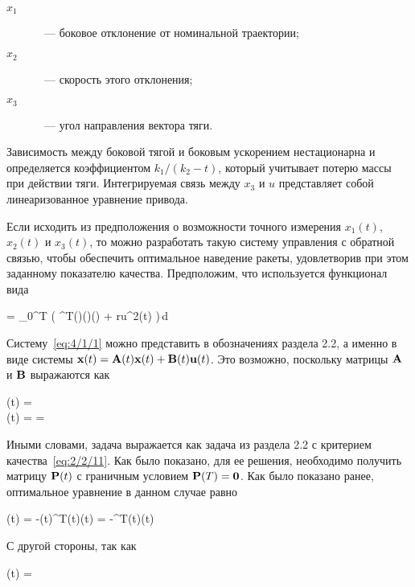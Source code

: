 \begin{description}
	\item[$x_1$]~--- боковое отклонение от номинальной траектории;
	\item[$x_2$]~--- скорость этого отклонения;
	\item[$x_3$]~--- угол направления вектора тяги.
\end{description}

Зависимость между боковой тягой и боковым ускорением нестационарна и определяется коэффициентом $k_1 / (k_2 - t)$, который учитывает потерю массы при действии тяги. Интегрируемая связь между $x_3$ и $u$ представляет собой линеаризованное уравнение привода.

Если исходить из предположения о возможности точного измерения $x_1(t)$, $x_2(t)$ и $x_3(t)$, то можно разработать такую систему управления с обратной связью, чтобы обеспечить оптимальное наведение ракеты, удовлетворив при этом заданному показателю качества. Предположим, что используется функционал вида

	\funcF =  \int\limits_0^T \bigl( ^T(\tau)(\tau)(\tau) + ru^2(t) \bigr)\,d\tau {}
\eeq

Систему~\ref{eq:4/1/1} можно представить в обозначениях раздела 2.2, а именно в виде системы $\mathbf{x}(t) = \mathbf{A}(t)\mathbf{x}(t) + \mathbf{B}(t)\mathbf{u}(t)$. Это возможно, поскольку матрицы $\mathbf{A}$ и $\mathbf{B}$ выражаются как

\beqarr
		(t) =  \text{;} \\
		(t) =  =  
\eeqarr

Иными словами, задача выражается как задача из раздела 2.2 с критерием качества~\vref{eq:2/2/11}. Как было показано, для ее решения, необходимо получить матрицу $\mathbf{P}(t)$ с граничным условием $\mathbf{P}(T) = \mathbf{0}$. Как было показано ранее, оптимальное уравнение в данном случае равно

	\optU(t) = -(t)^T(t)(t) = -^T(t)(t) 
\eeq

С другой стороны, так как

	(t) =  \text{,}
\eeq

